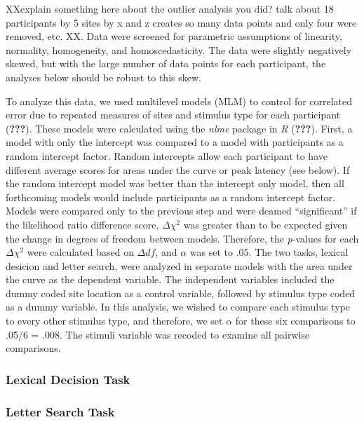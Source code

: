 \documentclass[english,man]{apa6}
\theoremstyle{definition}
\theoremstyle{definition}
\theoremstyle{definition}
\theoremstyle{remark}
\begin{document}
XXexplain something here about the outlier analysis you did? talk about
18 participants by 5 sites by x and z creates so many data points and
only four were removed, etc. XX. Data were screened for parametric
assumptions of linearity, normality, homogeneity, and homoscedasticity.
The data were slightly negatively skewed, but with the large number of
data points for each participant, the analyses below should be robust to
this skew.

To analyze this data, we used multilevel models (MLM) to control for
correlated error due to repeated measures of sites and stimulus type for
each participant ({\textbf{???}}). These models were calculated using
the \emph{nlme} package in \emph{R} ({\textbf{???}}). First, a model
with only the intercept was compared to a model with participants as a
random intercept factor. Random intercepts allow each participant to
have different average scores for areas under the curve or peak latency
(see below). If the random intercept model was better than the intercept
only model, then all forthcoming models would include participants as a
random intercept factor. Models were compared only to the previous step
and were deamed \enquote{significant} if the likelihood ratio difference
score, \(\Delta\chi^2\) was greater than to be expected given the change
in degrees of freedom between models. Therefore, the \emph{p}-values for
each \(\Delta\chi^2\) were calculated based on \(\Delta df\), and
\(\alpha\) was set to .05. The two tasks, lexical desicion and letter
search, were analyzed in separate models with the area under the curve
as the dependent variable. The independent variables included the dummy
coded site location as a control variable, followed by stimulus type
coded as a dummy variable. In this analysis, we wished to compare each
stimulus type to every other stimulus type, and therefore, we set
\(\alpha\) for these six comparisons to .05/6 = .008. The stimuli
variable was recoded to examine all pairwise comparisons.

\subsubsection{Lexical Decision Task}\label{lexical-decision-task}

\subsubsection{Letter Search Task}\label{letter-search-task}
\end{document}
